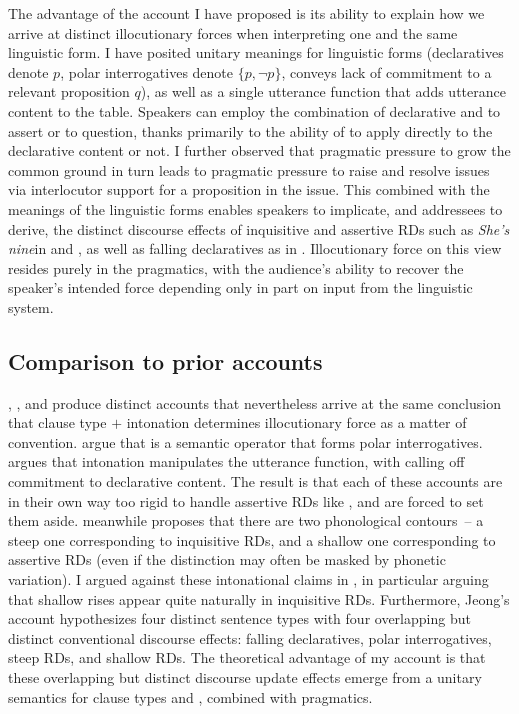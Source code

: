 \documentclass[output=paper,colorlinks,citecolor=brown]{langscibook}
\begin{document}
	The advantage of the account I have proposed is its ability to explain how we arrive at distinct illocutionary forces when interpreting one and the same linguistic form. I have posited unitary meanings for linguistic forms (declaratives denote $p$, polar interrogatives denote $\{p, \neg p\}$, \rise conveys lack of commitment to a relevant proposition $q$), as well as a single utterance function that adds utterance content to the table. Speakers can employ the combination of declarative and \rise to assert or to question, thanks primarily to the ability of \rise to apply directly to the declarative content or not. I further observed that pragmatic pressure to grow the common ground in turn leads to pragmatic pressure to raise and resolve issues via interlocutor support for a proposition in the issue. This combined with the meanings of the linguistic forms enables speakers to implicate, and addressees to derive, the distinct discourse effects of inquisitive and assertive RDs such as \emph{She's nine}\rise in  and , as well as  falling declaratives as in . Illocutionary force on this view resides purely in the pragmatics, with the audience's ability to recover the speaker's intended force depending only in part on input from the linguistic system. 
	
	
\subsection{Comparison to prior accounts} \label{priorAcc}
	
	\citet{farkas17}, \citet{jeong18}, and \citet{rudin18, rudin22} produce distinct accounts that nevertheless arrive at the same conclusion that clause type $+$ intonation determines illocutionary force as a matter of convention. \citet{farkas17} argue that \rise is a semantic operator that forms polar interrogatives. \citet{rudin18, rudin22} argues that intonation manipulates the utterance function, with \rise calling off commitment to declarative content. The result is that each of these accounts are in their own way too rigid to handle assertive RDs like , and are forced to set them aside.  \citet{jeong18} meanwhile proposes that there are two phonological contours~-- a steep one corresponding to inquisitive RDs, and a shallow one corresponding to assertive RDs (even if the distinction may often be masked by phonetic variation). I argued against these intonational claims in , in particular arguing that shallow rises appear quite naturally in inquisitive RDs. Furthermore, Jeong's account hypothesizes four distinct sentence types with four overlapping but distinct conventional discourse effects: falling declaratives, polar interrogatives, steep RDs, and shallow RDs. The theoretical advantage of my account is that these overlapping but distinct  discourse update effects emerge from a unitary semantics for clause types and \rise, combined with pragmatics.  
	
\end{document}
